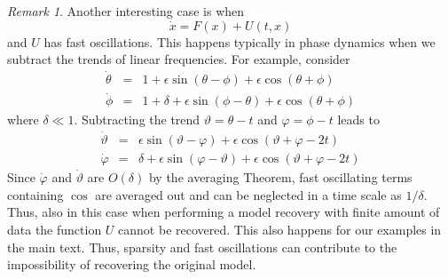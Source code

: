 \documentclass[12pt]{article}
\theoremstyle{plain}
\theoremstyle{definition}
\theoremstyle{remark}
\newtheorem{remk}[thr]{Remark}
\theoremstyle{remark}
\begin{document}
\begin{remk}
Another interesting case is when 
$$
\dot x = F(x) + U(t,x)
$$
and $U$ has fast oscillations. This happens typically in phase dynamics when we subtract the trends of linear frequencies. For example, consider 
\begin{eqnarray}
\dot \theta &=& 1  + \epsilon \sin(\theta - \phi ) + \epsilon \cos( \theta +\phi) \\
\dot \phi &=& 1+\delta  + \epsilon \sin(\phi-\theta ) + \epsilon \cos( \theta +\phi) 
\end{eqnarray}
where $\delta\ll1$. 
Subtracting the trend $\vartheta = \theta - t$ and $\varphi = \phi -t$ leads to 
\begin{eqnarray}
\dot \vartheta &=&  \epsilon \sin(\vartheta - \varphi ) + \epsilon \cos(\vartheta +\varphi - 2t ) \\
\dot \varphi &=& \delta  + \epsilon \sin(\varphi-\vartheta ) + \epsilon \cos(\vartheta +\varphi - 2 t) 
\end{eqnarray}
Since $\dot \varphi $ and $\dot \vartheta$ are $O(\delta)$ by the averaging Theorem, fast oscillating terms containing $\cos$ are averaged out and can be neglected in a time scale as $1/\delta$. Thus, also in this case when performing a model recovery with finite amount of data the function $U$ cannot be recovered. This also happens for our examples in the main text. Thus, sparsity and fast oscillations can contribute to the impossibility of recovering the original model. 
\end{remk}
 
\newpage
\end{document}
